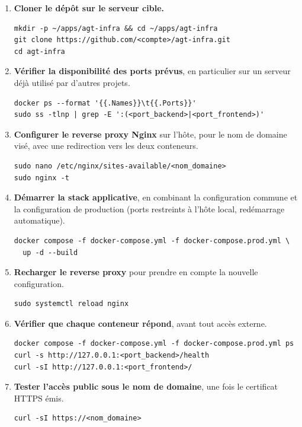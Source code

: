 \begin{enumerate}
  \item \textbf{Cloner le dépôt sur le serveur cible.}
\begin{lstlisting}
mkdir -p ~/apps/agt-infra && cd ~/apps/agt-infra
git clone https://github.com/<compte>/agt-infra.git
cd agt-infra
\end{lstlisting}

  \item \textbf{Vérifier la disponibilité des ports prévus}, en
        particulier sur un serveur déjà utilisé par d'autres projets.
\begin{lstlisting}
docker ps --format '{{.Names}}\t{{.Ports}}'
sudo ss -tlnp | grep -E ':(<port_backend>|<port_frontend>)'
\end{lstlisting}

  \item \textbf{Configurer le reverse proxy Nginx} sur l'hôte, pour le
        nom de domaine visé, avec une redirection vers les deux
        conteneurs.
\begin{lstlisting}
sudo nano /etc/nginx/sites-available/<nom_domaine>
sudo nginx -t
\end{lstlisting}

  \item \textbf{Démarrer la stack applicative}, en combinant la
        configuration commune et la configuration de production
        (ports restreints à l'hôte local, redémarrage automatique).
\begin{lstlisting}
docker compose -f docker-compose.yml -f docker-compose.prod.yml \
  up -d --build
\end{lstlisting}

  \item \textbf{Recharger le reverse proxy} pour prendre en compte la
        nouvelle configuration.
\begin{lstlisting}
sudo systemctl reload nginx
\end{lstlisting}

  \item \textbf{Vérifier que chaque conteneur répond}, avant tout accès
        externe.
\begin{lstlisting}
docker compose -f docker-compose.yml -f docker-compose.prod.yml ps
curl -s http://127.0.0.1:<port_backend>/health
curl -sI http://127.0.0.1:<port_frontend>/
\end{lstlisting}

  \item \textbf{Tester l'accès public sous le nom de domaine}, une fois
        le certificat HTTPS émis.
\begin{lstlisting}
curl -sI https://<nom_domaine>
\end{lstlisting}
\end{enumerate}

